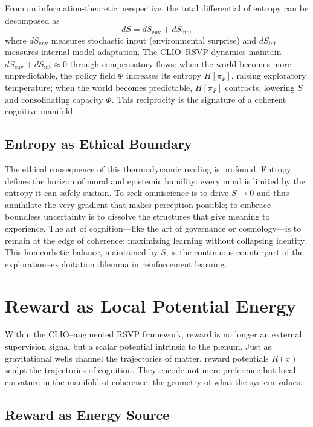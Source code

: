 \documentclass[11pt]{article}
\begin{document}
From an information-theoretic perspective, the total differential of entropy can be decomposed as
\[
dS = dS_{\mathrm{env}} + dS_{\mathrm{int}},
\]
where $dS_{\mathrm{env}}$ measures stochastic input (environmental surprise) and $dS_{\mathrm{int}}$ measures internal model adaptation.  
The CLIO–RSVP dynamics maintain $dS_{\mathrm{env}} + dS_{\mathrm{int}} \approx 0$ through compensatory flows:
when the world becomes more unpredictable, the policy field $\Psi$ increases its entropy $H[\pi_\Psi]$, raising exploratory temperature;
when the world becomes predictable, $H[\pi_\Psi]$ contracts, lowering $S$ and consolidating capacity $\Phi$.  
This reciprocity is the signature of a coherent cognitive manifold.

\subsection{Entropy as Ethical Boundary}

The ethical consequence of this thermodynamic reading is profound.  
Entropy defines the horizon of moral and epistemic humility: every mind is limited by the entropy it can safely sustain.  
To seek omniscience is to drive $S\!\rightarrow\!0$ and thus annihilate the very gradient that makes perception possible;  
to embrace boundless uncertainty is to dissolve the structures that give meaning to experience.  
The art of cognition—like the art of governance or cosmology—is to remain at the edge of coherence: maximizing learning without collapsing identity.  
This homeorhetic balance, maintained by $S$, is the continuous counterpart of the exploration–exploitation dilemma in reinforcement learning.

\section{Reward as Local Potential Energy}
Within the CLIO–augmented RSVP framework, reward is no longer an external supervision signal but a scalar potential intrinsic to the plenum.  
Just as gravitational wells channel the trajectories of matter, reward potentials $R(x)$ sculpt the trajectories of cognition.  
They encode not mere preference but local curvature in the manifold of coherence: the geometry of what the system values.

\subsection{Reward as Energy Source}
\end{document}
